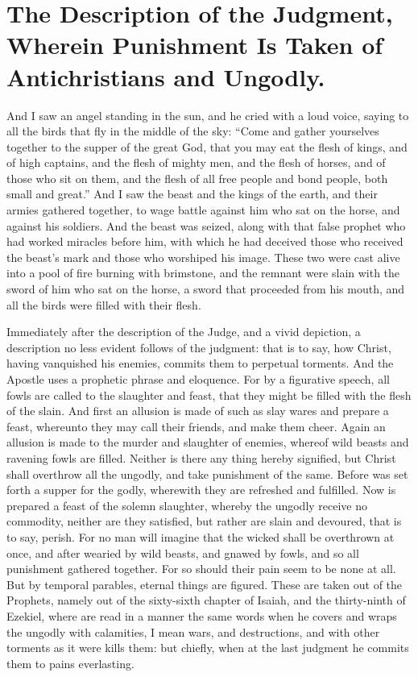 \chapter[Sermon 86. The Description of the Judgment, Wherein Punishment Is Taken of Antichristians and Ungodly.]{The Description of the Judgment, Wherein Punishment Is Taken of Antichristians and Ungodly.}
\label{sermon:086}

And I saw an angel standing in the sun, and he cried with a loud voice, saying to all the birds that fly in the middle of the sky: “Come and gather yourselves together to the supper of the great God, that you may eat the flesh of kings, and of high captains, and the flesh of mighty men, and the flesh of horses, and of those who sit on them, and the flesh of all free people and bond people, both small and great.” And I saw the beast and the kings of the earth, and their armies gathered together, to wage battle against him who sat on the horse, and against his soldiers. And the beast was seized, along with that false prophet who had worked miracles before him, with which he had deceived those who received the beast’s mark and those who worshiped his image. These two were cast alive into a pool of fire burning with brimstone, and the remnant were slain with the sword of him who sat on the horse, a sword that proceeded from his mouth, and all the birds were filled with their flesh.

Immediately after the description of the Judge, and a vivid depiction, a description no less evident follows of the judgment: that is to say, how Christ, having vanquished his enemies, commits them to perpetual torments. And the Apostle uses a prophetic phrase and eloquence. For by a figurative speech, all fowls are called to the slaughter and feast, that they might be filled with the flesh of the slain. And first an allusion is made of such as slay wares and prepare a feast, whereunto they may call their friends, and make them cheer. Again an allusion is made to the murder and slaughter of enemies, whereof wild beasts and ravening fowls are filled. Neither is there any thing hereby signified, but Christ shall overthrow all the ungodly, and take punishment of the same. Before was set forth a supper for the godly, wherewith they are refreshed and fulfilled. Now is prepared a feast of the solemn slaughter, whereby the ungodly receive no commodity, neither are they satisfied, but rather are slain and devoured, that is to say, perish. For no man will imagine that the wicked shall be overthrown at once, and after wearied by wild beasts, and gnawed by fowls, and so all punishment gathered together. For so should their pain seem to be none at all. But by temporal parables, eternal things are figured. These are taken out of the Prophets, namely out of the sixty-sixth chapter of Isaiah, and the thirty-ninth of Ezekiel, where are read in a manner the same words when he covers and wraps the ungodly with calamities, I mean wars, and destructions, and with other torments as it were kills them: but chiefly, when at the last judgment he commits them to pains everlasting.

